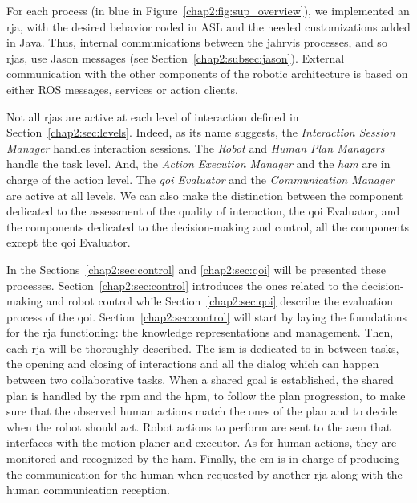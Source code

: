 \documentclass[a4paper,11pt,twoside]{StyleThese}
\begin{document}
For each process (in blue in Figure~\ref{chap2:fig:sup_overview}), we implemented an \acrshort{rja}, with the desired behavior coded in ASL and the needed customizations added in Java. Thus, internal communications between the \acrshort{jahrvis} processes, and so \acrshort{rja}s, use Jason messages (see Section~\ref{chap2:subsec:jason}). External communication with the other components of the robotic architecture is based on either ROS messages, services or action clients.

Not all \acrshort{rja}s are active at each level of interaction defined in Section~\ref{chap2:sec:levels}. Indeed, as its name suggests, the \textit{Interaction Session Manager} handles interaction sessions. The \textit{Robot} and \textit{Human Plan Managers} handle the task level. And, the \textit{Action Execution Manager} and the \textit{\acrlong{ham}} are in charge of the action level. The \textit{\acrshort{qoi} Evaluator} and the \textit{Communication Manager} are active at all levels. We can also make the distinction between the component dedicated to the assessment of the quality of interaction, \ie the \acrshort{qoi} Evaluator, and the components dedicated to the decision-making and control, \ie all the components except the \acrshort{qoi} Evaluator.

In the Sections~\ref{chap2:sec:control} and \ref{chap2:sec:qoi} will be presented these processes. Section~\ref{chap2:sec:control} introduces the ones related to the decision-making and robot control while Section~\ref{chap2:sec:qoi} describe the evaluation process of the \acrlong{qoi}. Section~\ref{chap2:sec:control} will start by laying the foundations for the \acrshort{rja} functioning: the knowledge representations and management. Then, each \acrshort{rja} will be thoroughly described. The \acrfull{ism} is dedicated to in-between tasks, \ie the opening and closing of interactions and all the dialog which can happen between two collaborative tasks. When a shared goal is established, the shared plan is handled by the \acrfull{rpm} and the \acrfull{hpm}, \ie to follow the plan progression, to make sure that the observed human actions match the ones of the plan and to decide when the robot should act. Robot actions to perform are sent to the \acrfull{aem} that interfaces with the motion planer and executor. As for human actions, they are monitored and recognized by the \acrfull{ham}. Finally, the \acrfull{cm} is in charge of producing the communication for the human when requested by another \acrshort{rja} along with the human communication reception.


\ifdefined{}
\else


\end{document}
